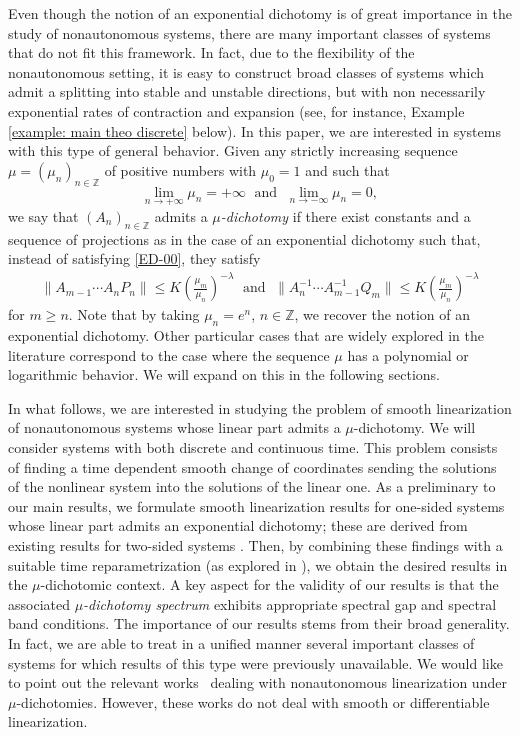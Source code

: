 \documentclass[reqno, a4paper, 10pt]{amsart}
\theoremstyle{plain}
\numberwithin{equation}{section}
\theoremstyle{remark}
\def\Z{\mathbb{Z}}
\begin{document}
Even though the notion of an exponential dichotomy is of great importance in the study of nonautonomous systems, there are many important classes of systems that do not fit this framework. 
In fact, due to the flexibility of the nonautonomous setting, it is easy to construct broad classes of systems which admit a splitting into stable and unstable directions, but with non necessarily exponential rates of contraction and expansion (see, for instance, Example \ref{example: main theo discrete} below). In this paper, we are interested in systems with this type of general behavior. 
Given any strictly increasing sequence $ \mu =(\mu_n)_{n\in \Z}$ of positive numbers with $\mu_0=1$ and such that 
\[
\lim_{n\to +\infty}\mu_n=+\infty \; \text{ and } \;  \lim_{n\to -\infty}\mu_n=0,
\]
we say that $(A_n)_{n\in \Z}$ admits a \emph{$\mu$-dichotomy} if there exist constants and a sequence of projections as in the case of an exponential dichotomy such that, instead of satisfying \eqref{ED-00}, they satisfy 
\begin{align*}
\| A_{m-1}\cdots A_n P_n\| \le  K \left(\frac{\mu_m}{\mu_n}\right)^{-\lambda} \;\text{ and }\;
\| A^{-1}_n\cdots A^{-1}_{m-1} Q_m\| \le   K \left(\frac{\mu_m}{\mu_n}\right)^{-\lambda}
\end{align*}
for $m\geq n$. Note that by taking $\mu_n=e^n$, $n\in \Z$, we recover the notion of an exponential dichotomy. Other particular cases that are widely explored in the literature correspond to the case where the sequence $\mu$ has a polynomial or logarithmic behavior. We will expand on this in the following sections.

In what follows, we are interested in studying the problem of smooth linearization of  nonautonomous systems whose linear part admits a $\mu$-dichotomy. We will consider systems with both discrete and continuous time.  This problem consists of finding a time dependent smooth change of coordinates sending the solutions of the nonlinear system into the solutions of the linear one. As a preliminary to our main results, we formulate smooth linearization results for one-sided systems whose linear part admits an exponential dichotomy; these are derived from existing results for two-sided systems \cite{DZZ,DZZ20}. Then, by combining these findings with a suitable time reparametrization (as explored in \cite{DS}), we obtain the desired results in the $\mu$-dichotomic context. A key aspect for the validity of our results is that the associated \emph{$\mu$-dichotomy spectrum} exhibits appropriate spectral gap and spectral band conditions.
The importance of our results stems from their broad generality. In fact, we are able to treat in a unified manner several important classes of systems for which results of this type were previously unavailable. We would like to point out the relevant works~\cite{BV, LX} dealing with nonautonomous linearization under $\mu$-dichotomies. However, these works do not deal with  smooth or differentiable linearization.
\end{document}
